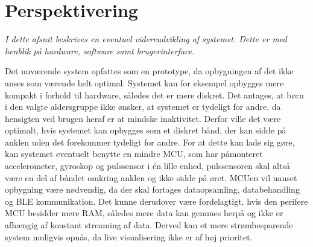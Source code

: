 \section{Perspektivering}
\textit{I dette afsnit beskrives en eventuel videreudvikling af systemet. Dette er med henblik på hardware, software samt brugerinterface.}

Det nuværende system opfattes som en prototype, da opbygningen af det ikke anses som værende helt optimal. Systemet kan for eksempel opbygges mere kompakt i forhold til hardware, således det er mere diskret. Det antages, at børn i den valgte aldersgruppe ikke ønsker, at systemet er tydeligt for andre, da hensigten ved brugen heraf er at mindske inaktivitet. Derfor ville det være optimalt, hvis systemet kan opbygges som et diskret bånd, der kan sidde på anklen uden det forekommer tydeligt for andre. For at dette kan lade sig gøre, kan systemet eventuelt benytte en mindre MCU, som har påmonteret accelerometer, gyroskop og pulssensor i én lille enhed, pulssensoren skal altså være en del af båndet omkring anklen og ikke sidde på øret. MCUen vil uanset opbygning være nødvendig, da der skal fortages dataopsamling, databehandling og BLE kommunikation. Det kunne derudover være fordelagtigt, hvis den perifere MCU besidder mere RAM, således mere data kan gemmes herpå og ikke er afhængig af konstant streaming af data. Derved kan et mere strømbesparende system muligvis opnås, da live visualisering ikke er af høj prioritet. 

